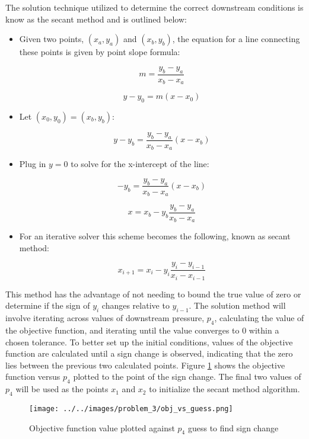 \documentclass[../main.tex]{subfiles}
\begin{document}
The solution technique utilized to determine the correct downstream conditions is know as the secant method and is outlined below:

\begin{itemize}

\item Given two points, \((x_a,y_a)\) and \((x_b,y_b)\), the equation for a line connecting these points is given by point slope formula:

\[
    m = \frac{y_b-y_a}{x_b-x_a}
\]

\[
    y - y_0 = m(x-x_0)
\]

\item Let \((x_0,y_0) = (x_b,y_b)\):

\[
    y - y_b = \frac{y_b-y_a}{x_b-x_a} \left({x-x_b}\right)
\]

\item Plug in \(y=0\) to solve for the x-intercept of the line:

\[
    - y_b = \frac{y_b-y_a}{x_b-x_a} \left({x-x_b}\right)
\]

\[
    x = x_b - y_b\frac{y_b-y_a}{x_b-x_a}
\]

\item For an iterative solver this scheme becomes the following, known as secant method:

\[
    x_{i+1}= x_i - y_i\frac{y_i-y_{i-1}}{x_i-x_{i-1}}
\]

\end{itemize}

This method has the advantage of not needing to bound the true value of zero or determine if the sign of \(y_i\) changes relative to \(y_{i-1}\).
The solution method will involve iterating across values of downstream pressure, \(p_4\), calculating the value of the objective function, and iterating until the value converges to 0 within a chosen tolerance.
To better set up the initial conditions, values of the objective function are calculated until a sign change is observed, indicating that the zero lies between the previous two calculated points.
Figure \ref{obj_vs_p} shows the objective function versus \(p_4\) plotted to the point of the sign change.
The final two values of \(p_4\) will be used as the points \(x_1\) and \(x_2\) to initialize the secant method algorithm.

\newpage

\begin{figure}[h!]
    \centering
    \texttt{[image: ../../images/problem\_3/obj\_vs\_guess.png]}
    \caption{Objective function value plotted against \(p_4\) guess to find sign change}
    \label{obj_vs_p}
\end{figure}
\end{document}
